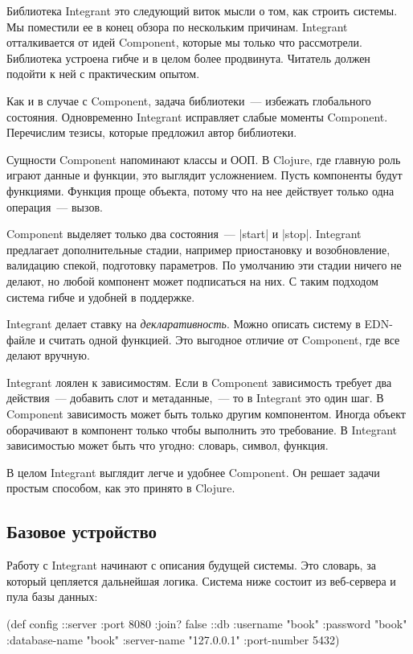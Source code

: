 Библиотека Integrant
это следующий виток мысли о том, как строить системы. Мы поместили ее в конец
обзора по нескольким причинам. Integrant отталкивается от идей
Component, которые мы только что рассмотрели. Библиотека устроена гибче
и в целом более продвинута. Читатель должен подойти к ней с практическим опытом.

Как и в случае с Component, задача библиотеки~--- избежать глобального
состояния. Одновременно Integrant исправляет слабые моменты
Component. Перечислим тезисы, которые предложил автор библиотеки.

Сущности Component напоминают классы и ООП. В Clojure, где главную роль
играют данные и функции, это выглядит усложнением. Пусть компоненты будут
функциями. Функция проще объекта, потому что на нее действует только одна
операция~--- вызов.

Component выделяет только два состояния~--- \spverb|start| и
\spverb|stop|. Integrant предлагает дополнительные стадии, например
приостановку и возобновление, валидацию спекой, подготовку параметров. По
умолчанию эти стадии ничего не делают, но любой компонент может подписаться на
них. С таким подходом система гибче и удобней в поддержке.

Integrant делает ставку на \emph{декларативность}. Можно описать
систему в EDN-файле и считать одной функцией. Это выгодное отличие от
Component, где все делают вручную.

Integrant лоялен к зависимостям. Если в Component зависимость
требует два действия~--- добавить слот и метаданные,~--- то в Integrant
это один шаг. В Component зависимость может быть только другим
компонентом. Иногда объект оборачивают в компонент только чтобы выполнить это
требование. В Integrant зависимостью может быть что угодно: словарь,
символ, функция.

В целом Integrant выглядит легче и удобнее Component. Он
решает задачи простым способом, как это принято в Clojure.

\subsection{Базовое устройство}

Работу с Integrant начинают с описания будущей системы. Это словарь, за
который цепляется дальнейшая логика. Система ниже состоит из веб-сервера и пула
базы данных:

\begin{english}
  \begin{clojure}
(def config
  {::server {:port 8080 :join? false}
   ::db {:username      "book"
         :password      "book"
         :database-name "book"
         :server-name   "127.0.0.1"
         :port-number   5432}})
  \end{clojure}
\end{english}


